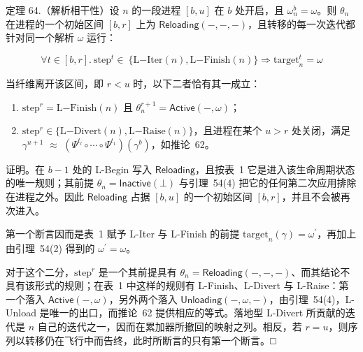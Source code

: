 定理 64.（解析相干性）设 \(n\) 的一段进程 \([ b , u ]\) 在 \(b\) 处开启，且 \(\omega _ { n } ^ { b } = \omega\)。则 \(\theta _ { n }\) 在进程的一个初始区间 \([ b , r ]\) 上为 \(\mathsf { R e l o a d i n g } ( - , - , - )\)，且转移的每一次迭代都针对同一个解析 \(\omega\) 运行：

\[
\forall t \in [ b , r ] . \ \mathrm { s t e p } ^ { t } \in \ \{ \mathrm { L } \mathrm { - } \mathrm { I t e r } ( n ) , \mathrm { L } \mathrm { - } \mathrm { F i n i s h } ( n ) \} \Rightarrow \mathrm { t a r g e t } _ { n } ^ { t } = \omega\tag{59}
\]

当纤维离开该区间，即 \(r < u\) 时，以下二者恰有其一成立：

\begin{enumerate}
\def\labelenumi{\arabic{enumi}.}
\item
  \(\mathrm { s t e p } ^ { r } = \mathrm { L } \mathrm { - F i n i s h } ( n )\) 且 \(\theta _ { n } ^ { r + 1 } = \mathsf { A c t i v e } ( - , \omega )\)；
\item
  \(\mathrm { s t e p } ^ { r } \in \{ \mathrm { L } \mathrm { - D i v e r t } ( n ) , \mathrm { L } \mathrm { - R a i s e } ( n ) \}\)，且进程在某个 \(u > r\) 处关闭，满足 \(\gamma ^ { u + 1 }\) $\approx$ \(\left( \Psi ^ { t _ { l } } \circ \cdots \circ \Psi ^ { t _ { 1 } } \right) \left( \gamma ^ { b } \right)\)，如推论~62。
\end{enumerate}

证明。在 \(b - 1\) 处的 L-Begin 写入 \(\mathsf { R e l o a d i n g }\)，且按表~1 它是进入该生命周期状态的唯一规则；其前提 \(\theta _ { n } = \mathsf { I n a c t i v e } ( \bot )\) 与引理~54(4) 把它的任何第二次应用排除在进程之外。因此 \(\mathsf { R e l o a d i n g }\) 占据 \([ b , u ]\) 的一个初始区间 \([ b , r ]\)，并且不会被再次进入。

第一个断言因而是表~1 赋予 L-Iter 与 L-Finish 的前提 \(\mathrm { t a r g e t } _ { n } ( \gamma ) = \omega ^ { \prime }\)，再加上由引理~54(2) 得到的 \(\omega ^ { \prime } = \omega\)。

对于这个二分，\(\mathrm { s t e p } ^ { r }\) 是一个其前提具有 \(\theta _ { n } = \mathsf { R e l o a d i n g } ( - , - , - )\)、而其结论不具有该形式的规则；在表~1 中这样的规则有 L-Finish、L-Divert 与 L-Raise：第一个落入 \(\mathsf { A c t i v e } ( - , \omega )\)，另外两个落入 \(\mathsf { U n l o a d i n g } ( - , \omega , - )\)，由引理~54(4)，L-Unload 是唯一的出口，而推论~62 提供相应的等式。落地型 L-Divert 所贡献的迭代是 \(n\) 自己的迭代之一，因而在累加器所撤回的映射之列。相反，若 \(r = u\)，则序列以转移仍在飞行中而告终，此时所断言的只有第一个断言。□
